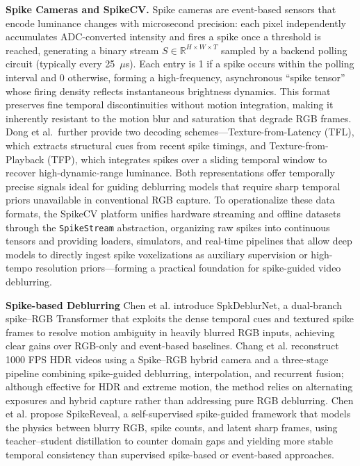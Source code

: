 \documentclass[conference]{IEEEtran}
\begin{document}
\noindent\textbf{Spike Cameras and SpikeCV.} Spike cameras \cite{dong_spike_2021} are event-based sensors that encode luminance changes with microsecond precision: each pixel independently accumulates ADC-converted intensity and fires a spike once a threshold is reached, generating a binary stream 
$S \in \mathbb{R}^{H \times W \times T}$
sampled by a backend polling circuit (typically every 25~$\mu$s). Each entry is 1 if a spike occurs within the polling interval and 0 otherwise, forming a high-frequency, asynchronous “spike tensor” whose firing density reflects instantaneous brightness dynamics. This format preserves fine temporal discontinuities without motion integration, making it inherently resistant to the motion blur and saturation that degrade RGB frames. Dong et al.\ further provide two decoding schemes—Texture-from-Latency (TFL), which extracts structural cues from recent spike timings, and Texture-from-Playback (TFP), which integrates spikes over a sliding temporal window to recover high-dynamic-range luminance. Both representations offer temporally precise signals ideal for guiding deblurring models that require sharp temporal priors unavailable in conventional RGB capture. To operationalize these data formats, the SpikeCV platform \cite{zheng_spikecv_2024} unifies hardware streaming and offline datasets through the \texttt{SpikeStream} abstraction, organizing raw spikes into continuous tensors and providing loaders, simulators, and real-time pipelines that allow deep models to directly ingest spike voxelizations as auxiliary supervision or high-tempo resolution priors—forming a practical foundation for spike-guided video deblurring.

\noindent\textbf{Spike-based Deblurring} Chen et al.\cite{chen_enhancing_2023} introduce SpkDeblurNet, a dual-branch spike–RGB Transformer that exploits the dense temporal cues and textured spike frames to resolve motion ambiguity in heavily blurred RGB inputs, achieving clear gains over RGB-only and event-based baselines. Chang et al.\cite{chang_1000_2023} reconstruct 1000 FPS HDR videos using a Spike–RGB hybrid camera and a three-stage pipeline combining spike-guided deblurring, interpolation, and recurrent fusion; although effective for HDR and extreme motion, the method relies on alternating exposures and hybrid capture rather than addressing pure RGB deblurring. Chen et al.\cite{chen_spikereveal_2024} propose SpikeReveal, a self-supervised spike-guided framework that models the physics between blurry RGB, spike counts, and latent sharp frames, using teacher–student distillation to counter domain gaps and yielding more stable temporal consistency than supervised spike-based or event-based approaches.
\end{document}
